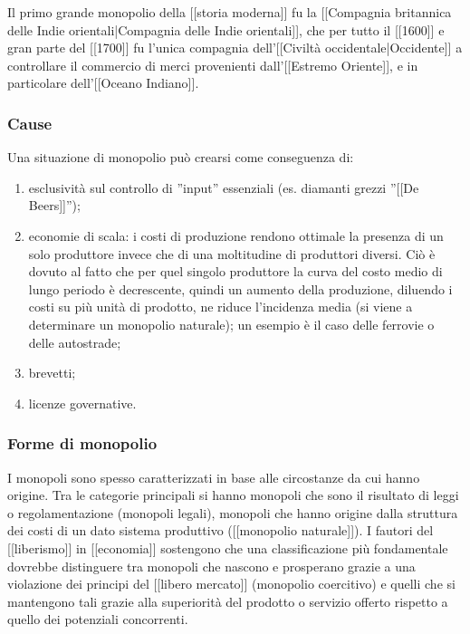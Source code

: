 Il primo grande monopolio della [[storia moderna]] fu la [[Compagnia britannica 
delle Indie orientali|Compagnia delle Indie orientali]], che per tutto il 
[[1600]] e gran parte del [[1700]] fu l'unica compagnia dell'[[Civiltà 
occidentale|Occidente]] a controllare il commercio di merci provenienti 
dall'[[Estremo Oriente]], e in particolare dell'[[Oceano Indiano]].

\subsubsection{Cause}

Una situazione di monopolio può crearsi come conseguenza di:

\begin{enumerate} [noitemsep]
 \item esclusività sul controllo di ''input'' essenziali (es. diamanti grezzi 
''[[De Beers]]'');
 \item economie di scala: i costi di produzione rendono ottimale la presenza 
di un solo produttore invece che di una moltitudine di produttori diversi. Ciò 
è dovuto al fatto che per quel singolo produttore la curva del costo medio di 
lungo periodo è decrescente, quindi un aumento della produzione, diluendo i 
costi su più unità di prodotto, ne riduce l'incidenza media (si viene a 
determinare un monopolio naturale); un esempio è il caso delle ferrovie o 
delle autostrade;
 \item brevetti;
 \item licenze governative.
\end{enumerate}

\subsubsection{Forme di monopolio}
I monopoli sono spesso caratterizzati in base alle circostanze da cui hanno 
origine. Tra le categorie principali si hanno monopoli che sono il risultato di 
leggi o regolamentazione (monopoli legali), monopoli che hanno origine dalla 
struttura dei costi di un dato sistema produttivo ([[monopolio naturale]]). I 
fautori del [[liberismo]] in [[economia]] sostengono che una classificazione 
più fondamentale dovrebbe distinguere tra monopoli che nascono e prosperano 
grazie a una violazione dei principi del [[libero mercato]] (monopolio 
coercitivo) e quelli che si mantengono tali grazie alla superiorità del 
prodotto o servizio offerto rispetto a quello dei potenziali concorrenti.


